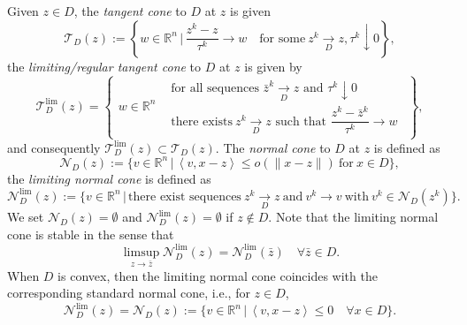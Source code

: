 \documentclass[11pt,a4paper,reqno]{amsart}
\newtheorem{corollary}[theorem]{Corollary}
\begin{document}
{Given $z\in D$, the \emph{tangent cone} to $D$ at $z$ is given
\begin{equation*}
    \mathcal T_D(z):=\left\{ w \in \mathbb R^n \,\big|\, \frac{z^k-z}{\tau^k} \to w \quad \text{for some} \ z^k \xrightarrow[D]{} z, \tau^k \downarrow 0\right\},
    \end{equation*}
the \emph{limiting/regular tangent cone} to $D$ at $z$ is given by
\begin{equation*}
\mathcal T_D^{\mathrm{lim}}(z)
=
\left\{
\begin{array}{l|l}
w\in\mathbb R^n
&
\begin{array}{l}
\text{for all sequences } \bar z^k \xrightarrow[D]{} z
\text{ and } \tau^k\downarrow 0\\
\text{there exists}\ z^k \xrightarrow[D]{} z
\text{ such that }
\dfrac{z^k-\bar z^k}{\tau^k}\to w
\end{array}
\end{array}
\right\},
\end{equation*}
and consequently $\mathcal T_D^{\mathrm{lim}}(z) \subset \mathcal T_D(z)$.
The \emph{normal cone} to $D$ at $z$ is defined as
\begin{equation*}
    \mathcal N_D(z):=\{ v\in \mathbb R^n \,\big|\, \left<v,x-z\right>\leq o(\|x-z\|) \ \text{for} \ x\in D\},
\end{equation*}
the \emph{limiting normal cone} is defined as
\begin{equation*}
    \mathcal N_D^{\lim}(z):=\{ v\in \mathbb R^n \,|\, \text{there exist sequences} \ z^k \xrightarrow[D]{} z \ \text{and} \ v^k\to v \ \text{with} \ v^k\in \mathcal N_D(z^k)\}.
\end{equation*}
We set $\mathcal N_D(z)=\emptyset$ and $\mathcal N_D^{\lim}(z)=\emptyset$ if $z\notin D$. Note that the limiting normal cone is stable in the sense that
\begin{equation}\label{Eq:robustlimnormalcone}
    \limsup_{z\to \bar z} \mathcal N_D^{\lim}(z)=\mathcal N_D^{\lim}(\bar z) \quad \forall \bar z \in D.
\end{equation}
When $D$ is convex, then the limiting normal cone coincides with the corresponding standard normal cone, i.e., for $z\in D$,
\begin{equation*}
    \mathcal N_D^{\lim}(z)=\mathcal N_D(z):=\{ v\in \mathbb R^n \,|\, \left<v,x-z\right>\leq 0 \quad \forall{x\in D}\}.
\end{equation*}

}
\end{document}
